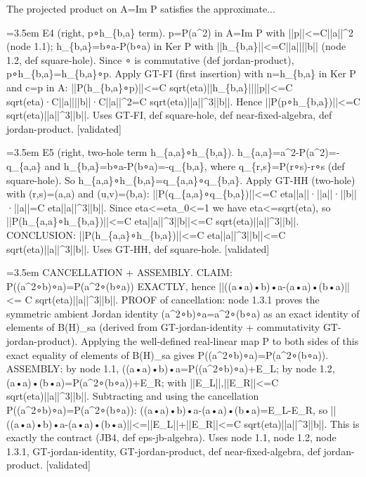 \documentclass{article}
\newcommand{\step}[1]{\par\noindent\hangindent=3.5em\hangafter=1%
  \makebox[3.5em][l]{\textbf{#1.}}}
\newcommand{\steptag}[1]{\hfill{\small\textsf{[#1]}}}
\begin{document}
\begin{proofbox}{The projected product on A=Im P satisfies the approximate...}
\step{1.2.2} E4 (right, p∘h\_\{b,a\} term). p=P(a\textasciicircum{}2) in A=Im P with ||p||<=C||a||\textasciicircum{}2 (node 1.1); h\_\{b,a\}=b∘a-P(b∘a) in Ker P with ||h\_\{b,a\}||<=C||a||||b|| (node 1.2, def square-hole). Since ∘ is commutative (def jordan-product), p∘h\_\{b,a\}=h\_\{b,a\}∘p. Apply GT-FI (first insertion) with n=h\_\{b,a\} in Ker P and c=p in A: ||P(h\_\{b,a\}∘p)||<=C sqrt(eta)||h\_\{b,a\}||||p||<=C sqrt(eta)·C||a||||b||·C||a||\textasciicircum{}2=C sqrt(eta)||a||\textasciicircum{}3||b||. Hence ||P(p∘h\_\{b,a\})||<=C sqrt(eta)||a||\textasciicircum{}3||b||. Uses GT-FI, def square-hole, def near-fixed-algebra, def jordan-product. \steptag{validated} \\[4pt]
\step{1.2.3} E5 (right, two-hole term h\_\{a,a\}∘h\_\{b,a\}). h\_\{a,a\}=a\textasciicircum{}2-P(a\textasciicircum{}2)=-q\_\{a,a\} and h\_\{b,a\}=b∘a-P(b∘a)=-q\_\{b,a\}, where q\_\{r,s\}=P(r∘s)-r∘s (def square-hole). So h\_\{a,a\}∘h\_\{b,a\}=q\_\{a,a\}∘q\_\{b,a\}. Apply GT-HH (two-hole) with (r,s)=(a,a) and (u,v)=(b,a): ||P(q\_\{a,a\}∘q\_\{b,a\})||<=C eta||a||·||a||·||b||·||a||=C eta||a||\textasciicircum{}3||b||. Since eta<=eta\_0<=1 we have eta<=sqrt(eta), so ||P(h\_\{a,a\}∘h\_\{b,a\})||<=C eta||a||\textasciicircum{}3||b||<=C sqrt(eta)||a||\textasciicircum{}3||b||. CONCLUSION: ||P(h\_\{a,a\}∘h\_\{b,a\})||<=C eta||a||\textasciicircum{}3||b||<=C sqrt(eta)||a||\textasciicircum{}3||b||. Uses GT-HH, def square-hole. \steptag{validated} \\[4pt]
\step{1.3} CANCELLATION + ASSEMBLY. CLAIM: P((a\textasciicircum{}2∘b)∘a)=P(a\textasciicircum{}2∘(b∘a)) EXACTLY, hence ||((a•a)•b)•a-(a•a)•(b•a)|| <= C sqrt(eta)||a||\textasciicircum{}3||b||. PROOF of cancellation: node 1.3.1 proves the symmetric ambient Jordan identity (a\textasciicircum{}2∘b)∘a=a\textasciicircum{}2∘(b∘a) as an exact identity of elements of B(H)\_sa (derived from GT-jordan-identity + commutativity GT-jordan-product). Applying the well-defined real-linear map P to both sides of this exact equality of elements of B(H)\_sa gives P((a\textasciicircum{}2∘b)∘a)=P(a\textasciicircum{}2∘(b∘a)). ASSEMBLY: by node 1.1, ((a•a)•b)•a=P((a\textasciicircum{}2∘b)∘a)+E\_L; by node 1.2, (a•a)•(b•a)=P(a\textasciicircum{}2∘(b∘a))+E\_R; with ||E\_L||,||E\_R||<=C sqrt(eta)||a||\textasciicircum{}3||b||. Subtracting and using the cancellation P((a\textasciicircum{}2∘b)∘a)=P(a\textasciicircum{}2∘(b∘a)): ((a•a)•b)•a-(a•a)•(b•a)=E\_L-E\_R, so ||((a•a)•b)•a-(a•a)•(b•a)||<=||E\_L||+||E\_R||<=C sqrt(eta)||a||\textasciicircum{}3||b||. This is exactly the contract (JB4, def eps-jb-algebra). Uses node 1.1, node 1.2, node 1.3.1, GT-jordan-identity, GT-jordan-product, def near-fixed-algebra, def jordan-product. \steptag{validated} \\[6pt]

\end{proofbox}
\end{document}
